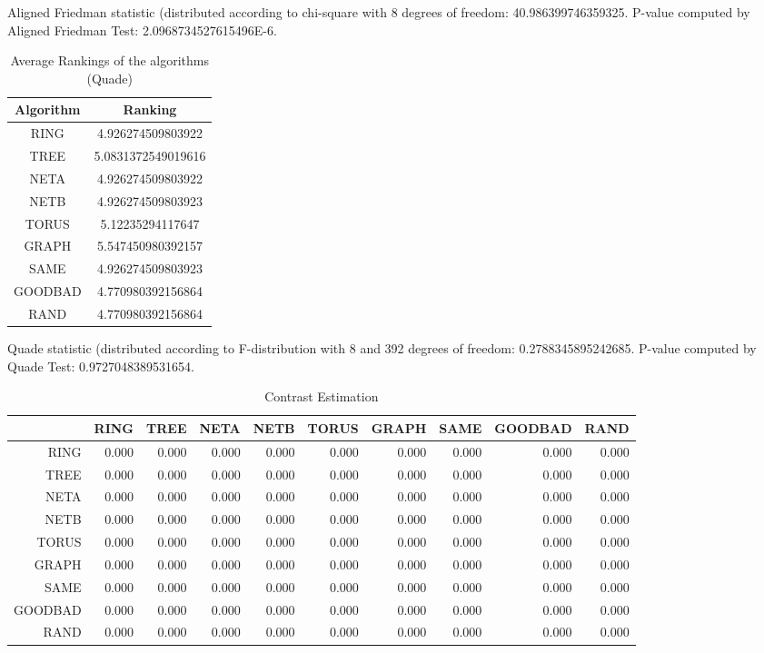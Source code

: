 \documentclass[a4paper,10pt]{article}
\begin{document}
\begin{landscape}
Aligned Friedman statistic (distributed according to chi-square with 8 degrees of freedom: 40.986399746359325. 
P-value computed by Aligned Friedman Test: 2.0968734527615496E-6.\newline


\newpage

\begin{table}[!htp]
\centering
\caption{Average Rankings of the algorithms (Quade)
}\begin{tabular}{c|c}
Algorithm&Ranking\\
\hline
 RING&4.926274509803922\\
 TREE&5.0831372549019616\\
 NETA&4.926274509803922\\
 NETB&4.926274509803923\\
 TORUS&5.12235294117647\\
 GRAPH&5.547450980392157\\
 SAME&4.926274509803923\\
 GOODBAD&4.770980392156864\\
 RAND&4.770980392156864\\
\end{tabular}
\end{table}
Quade statistic (distributed according to F-distribution with 8 and 392 degrees of freedom: 0.2788345895242685. 
P-value computed by Quade Test: 0.9727048389531654.\newline


\newpage

\begin{table}[!htp]
\centering\tiny
\caption{Contrast Estimation}
\begin{tabular}{
|r|r|r|r|r|r|r|r|r|r|}
\hline
 & RING& TREE& NETA& NETB& TORUS& GRAPH& SAME& GOODBAD& RAND\\
\hline
 RING&0.000&0.000&0.000&0.000&0.000&0.000&0.000&0.000&0.000\\
\hline
 TREE&0.000&0.000&0.000&0.000&0.000&0.000&0.000&0.000&0.000\\
\hline
 NETA&0.000&0.000&0.000&0.000&0.000&0.000&0.000&0.000&0.000\\
\hline
 NETB&0.000&0.000&0.000&0.000&0.000&0.000&0.000&0.000&0.000\\
\hline
 TORUS&0.000&0.000&0.000&0.000&0.000&0.000&0.000&0.000&0.000\\
\hline
 GRAPH&0.000&0.000&0.000&0.000&0.000&0.000&0.000&0.000&0.000\\
\hline
 SAME&0.000&0.000&0.000&0.000&0.000&0.000&0.000&0.000&0.000\\
\hline
 GOODBAD&0.000&0.000&0.000&0.000&0.000&0.000&0.000&0.000&0.000\\
\hline
 RAND&0.000&0.000&0.000&0.000&0.000&0.000&0.000&0.000&0.000\\
\hline


\end{tabular}
\end{table}
\end{landscape}
\end{document}
